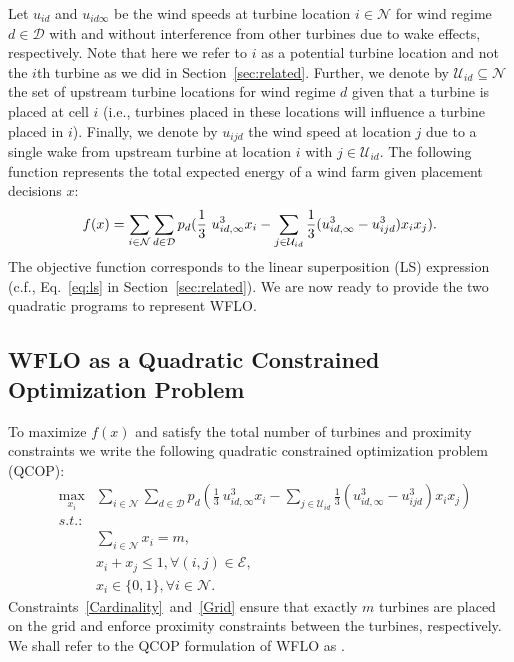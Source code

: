 \documentclass[preprint,12pt]{elsarticle}
\newcommand{\qcls}{{\sf {\small QC-LS\xspace}}}
\begin{document}
Let $u_{id}$ and $u_{id\infty}$ 
be the wind speeds at turbine location $i \in \mathcal{N}$ for wind regime $d \in \mathcal{D}$
with and without interference from other turbines due to wake effects, respectively. 
Note that here we refer to $i$ as a potential turbine location and not the $i$th turbine as we did in Section~\ref{sec:related}.
Further, we denote by $\mathcal{U}_{id} \subseteq \mathcal{N}$ 
the set of upstream 
turbine locations for wind regime $d$
given that a turbine is placed at cell $i$ (i.e., turbines placed in these locations 
will influence a turbine placed in $i$). Finally,
we denote by $u_{ijd}$ the wind speed at location $j$ due to a single wake from upstream turbine at location $i$ with $j \in \mathcal{U}_{id}$. 
The following function  
represents the total expected energy of a wind farm given placement decisions 
$x$: \begin{equation}
f(x) = \sum_{i \in \mathcal{N}}^{} \sum_{d \in \mathcal{D}}^{} p_d ( \frac{1}{3} \ u_{id, \infty}^3 x_i  - \sum_{j \in \mathcal{U}_{id}}^{} \frac{1}{3}(u_{id, \infty} ^3 - u_{ijd}^3)x_i x_j).   \label{ObjFunc}\\
\end{equation} The objective function corresponds to the linear superposition (LS)
expression (c.f., Eq.~\ref{eq:ls} in Section~\ref{sec:related}). We are now ready to provide the two quadratic programs to represent WFLO.

\subsection{WFLO as a Quadratic Constrained Optimization Problem}

To 
maximize $f(x)$ and satisfy the total number of turbines and proximity 
constraints we write
the following quadratic constrained optimization problem (QCOP):
\begin{eqnarray} \label{QCOP}
&\max_{x_i}^{}& \sum_{i \in \mathcal{N}}^{} \sum_{d \in \mathcal{D}}^{} p_d ( \frac{1}{3} \ u_{id, \infty}^3 x_i  - \sum_{j \in \mathcal{U}_{id}}^{} \frac{1}{3}(u_{id, \infty} ^3 - u_{ijd}^3)x_i x_j)   \\
&s.t.:& \nonumber\\
&\mbox{       }& \sum_{i \in \mathcal{N}}^{} x_i = m,\label{Cardinality}\\
&\mbox{       }& x_i + x_j \leq 1,   \forall (i,j) \in \mathcal{E}, \label{Grid}\\
&\mbox{       }& x_i \in \{0,1\},     \forall i \in \mathcal{N}. \label{Vars}
\end{eqnarray} Constraints~\ref{Cardinality}~and~\ref{Grid} ensure that exactly $m$ turbines are placed on the grid
and enforce proximity constraints between the turbines, respectively. We shall refer to the QCOP
formulation of WFLO as \qcls{}. 
\end{document}
